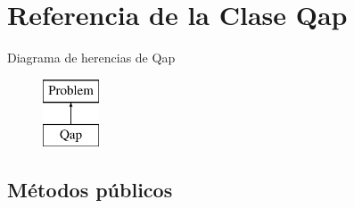 \hypertarget{class_qap}{\section{Referencia de la Clase Qap}
\label{class_qap}
}
Diagrama de herencias de Qap\begin{figure}[H]
\begin{center}
\leavevmode
\includegraphics[height=2.000000cm]{class_qap}
\end{center}
\end{figure}
\subsection*{Métodos públicos}
